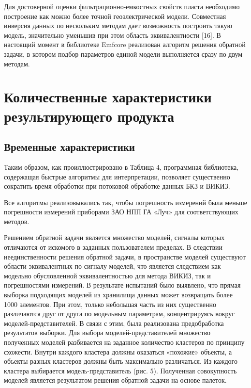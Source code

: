 Для достоверной оценки фильтрационно-емкостных свойств пласта необходимо
построение как можно более точной геоэлектрической модели. Совместная
инверсия данных по нескольким методам дает возможность построить такую
модель, значительно уменьшив при этом область эквивалентности [16]. В
настоящий момент в библиотеке Emfcore реализован алгоритм решения обратной
задачи, в котором подбор параметров единой модели выполняется сразу по двум
методам.

\section{Количественные характеристики результирующего продукта}

\subsection{Временные характеристики}

Таким образом, как проиллюстрировано в Таблица 4, программная библиотека,
содержащая быстрые алгоритмы для интерпретации, позволяет существенно
сократить время обработки при потоковой обработке данных БКЗ и ВИКИЗ.

Все алгоритмы реализовывались так, чтобы погрешность измерений была меньше
погрешности измерений приборами ЗАО НПП ГА «Луч» для соответствующих
методов.

Решением обратной задачи является множество моделей, сигналы которых
отличаются от искомого в заданных пользователем пределах. В следствии
неединственности решения обратной задачи, в пространстве моделей существуют
области эквивалентных по сигналу моделей, что является следствием как
модельно обусловленной эквивалентностью для метода ВИКИЗ, так и
погрешностями измерений. В результате испытаний было выявлено, что прямая
выборка подходящих моделей из хранилища данных может возвращать более 1000
элементов. При этом,  только небольшая часть из них существенно различаются
друг от друга по модельным параметрам, концентрируясь вокруг
моделей-представителей. В связи с этим, была реализована предобработка
результатов выборки. Для выбора моделей-представителей множество полученных
моделей разбивается на заданное количество кластеров по принципу схожести.
Внутри каждого кластера должны оказаться «похожие» объекты, а объекты
разных кластеров должны быть максимально различаться. Из каждого кластера
выбирается модель-представитель (рис. 5). Полученная совокупность моделей
является результатом решения обратной задачи на основе палеток.

